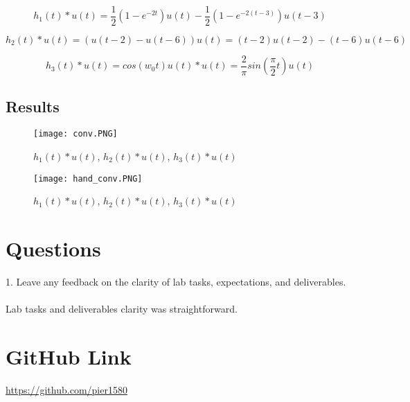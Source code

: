 \paragraph{}

\[h_{1}(t)*u(t)=\frac{1}{2}(1-e^{-2t})u(t)-\frac{1}{2}(1-e^{-2(t-3)})u(t-3)\]

\[h_2(t)*u(t) = (u(t-2) - u(t-6))u(t) = (t-2)u(t-2) - (t-6)u(t-6)\]
       
\[h_3(t)*u(t) = cos(w_{0}t)u(t)*u(t) =\frac{2}{\pi}sin(\frac{\pi}{2}t)u(t)\]

\subsection{Results}

 \begin{figure}[H]
	   \centering
	   \texttt{[image: conv.PNG]}
	   \caption{$h_{1}(t)*u(t)$, $h_{2}(t)*u(t)$, $h_{3}(t)*u(t)$}
 \end{figure}
 
  \begin{figure}[H]
 	   \centering
 	   \texttt{[image: hand\_conv.PNG]}
 	   \caption{$h_{1}(t)*u(t)$, $h_{2}(t)*u(t)$, $h_{3}(t)*u(t)$}
  \end{figure}

\section{Questions}

1. Leave any feedback on the clarity of lab tasks, expectations, and deliverables.
\\ \\
Lab tasks and deliverables clarity was straightforward.  

\section{GitHub Link}
\url{https://github.com/pier1580}
